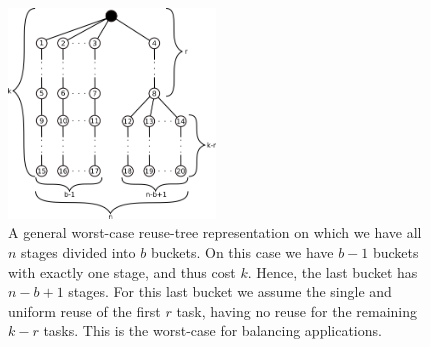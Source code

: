 


\begin{figure}[b!]
\begin{center}
	\includegraphics[width=0.49\textwidth]{img/complex}
	\caption{A general worst-case reuse-tree representation on which we have all $n$ stages divided into $b$ buckets. On this case we have $b-1$ buckets with exactly one stage, and thus cost $k$. Hence, the last bucket has $n-b+1$ stages. For this last bucket we assume the single and uniform reuse of the first $r$ task, having no reuse for the remaining $k-r$ tasks. This is the worst-case for balancing applications.}
\label{fig:complex}
\end{center}
\vspace{-4mm}
\end{figure}

